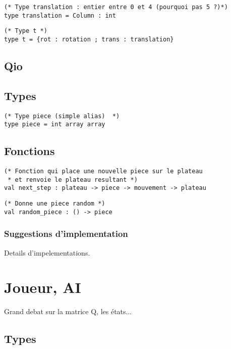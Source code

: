 \documentclass{article}
\begin{document}
\begin{lstlisting}[frame=L]
(* Type translation : entier entre 0 et 4 (pourquoi pas 5 ?)*)
type translation = Column : int
\end{lstlisting}

\begin{lstlisting}[frame=L]
(* Type t *)
type t = {rot : rotation ; trans : translation}
\end{lstlisting}

\subsection{Qio}


\subsection{Types}


\begin{lstlisting}[frame=L]
(* Type piece (simple alias)  *)
type piece = int array array
\end{lstlisting}

\subsection{Fonctions}


\begin{lstlisting}[frame=L]
(* Fonction qui place une nouvelle piece sur le plateau
 * et renvoie le plateau resultant *)
val next_step : plateau -> piece -> mouvement -> plateau
\end{lstlisting}

\begin{lstlisting}[frame=L]
(* Donne une piece random *)
val random_piece : () -> piece
\end{lstlisting}

\subsubsection{Suggestions d'implementation}

Details d'impelementations.

\section{Joueur, AI}

Grand debat sur la matrice Q, les états...

\subsection{Types}
\end{document}
